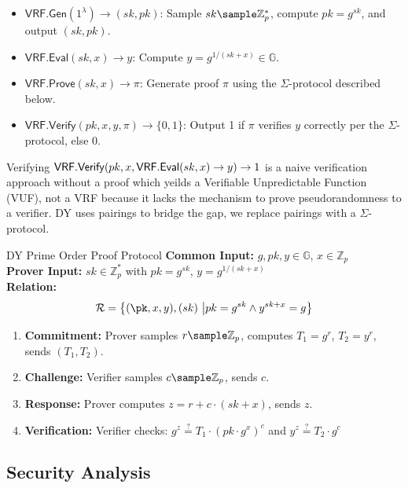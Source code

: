 \begin{itemize}
    \item $\mathsf{VRF.Gen}(1^\lambda) \to (sk, pk)$: Sample $sk \sample \mathbb{Z}_p^*$, compute $pk = g^{sk}$, and output $(sk, pk)$.
    \item $\mathsf{VRF.Eval}(sk, x) \to y$: Compute $y = g^{1/(sk + x)} \in \mathbb{G}$.
    \item $\mathsf{VRF.Prove}(sk, x) \to \pi$: Generate proof $\pi$ using the $\Sigma$-protocol described below.
    \item $\mathsf{VRF.Verify}(pk, x, y, \pi) \to \{0, 1\}$: Output 1 if $\pi$ verifies $y$ correctly per the $\Sigma$-protocol, else 0.
\end{itemize}

\begin{remark}
    Verifying $\mathsf{VRF.Verify}(pk, x, \mathsf{VRF.Eval}(sk, x) \to y) \to 1$ is a naive verification approach without a proof which yeilds a Verifiable Unpredictable Function (VUF), not a VRF because it lacks the mechanism to prove pseudorandomness to a verifier. DY uses pairings to bridge the gap, we replace pairings with a $\Sigma$-protocol. 
\end{remark}

\begin{protocol}{DY Prime Order Proof Protocol}{}\label{protocol-pdy-protocol1}
\textbf{Common Input:} $g, pk, y \in \mathbb{G}$, $x \in \mathbb{Z}_p$ \\
\textbf{Prover Input:} $sk \in \mathbb{Z}_p^*$ with $pk = g^{sk}$, $y = g^{1/(sk + x)}$ \\
\textbf{Relation: }
\[
\mathcal{R} = \left\{ (\pk, x, y), (sk) \ \middle| pk = g^{sk} \land y^{sk + x} = g \right\}
\]
\begin{enumerate}
    \item \textbf{Commitment:} Prover samples $r \sample  \mathbb{Z}_p$, computes $T_1 = g^r$, $T_2 = y^r$, sends $(T_1, T_2)$.
    \item \textbf{Challenge:} Verifier samples $c \sample  \mathbb{Z}_p$, sends $c$.
    \item \textbf{Response:} Prover computes $z = r + c \cdot (sk + x)$, sends $z$.
    \item \textbf{Verification:} Verifier checks: $g^z \stackrel{?}{=} T_1 \cdot (pk \cdot g^x)^c$ and $y^z \stackrel{?}{=} T_2 \cdot g^c$
\end{enumerate}
\end{protocol}

\subsection{Security Analysis}

